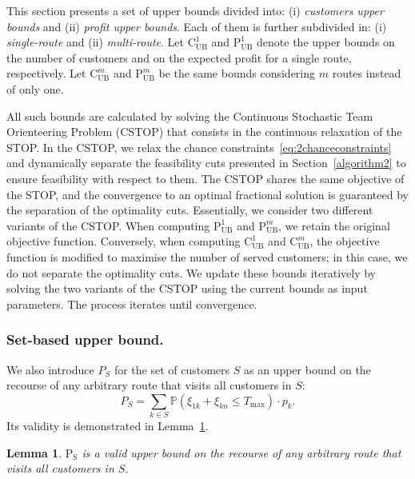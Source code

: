 \documentclass[11pt]{article}
\newtheorem{lemma}[theorem]{Lemma}
\theoremstyle{definition}
\begin{document}
This section presents a set of upper bounds divided into: (i) \emph{customers upper bounds} and (ii) \emph{profit upper bounds}. Each of them is further subdivided in: (i) \emph{single-route} and (ii) \emph{multi-route}. Let $\text{C}^1_{\text{UB}}$ and $\text{P}^1_{\text{UB}}$ denote the upper bounds on the number of customers and on the expected profit for a single route, respectively. Let $\text{C}^m_{\text{UB}}$ and $\text{P}^m_{\text{UB}}$ be the same bounds considering $m$ routes instead of only one.

All such bounds are calculated by solving the Continuous Stochastic Team Orienteering Problem (CSTOP) that consists in the continuous relaxation of the STOP. In the CSTOP, we relax the chance constraints~\eqref{eq:2chanceconstraints} and dynamically separate the feasibility cuts presented in Section~\ref{algorithm2} to ensure feasibility with respect to them. The CSTOP shares the same objective of the STOP, and the convergence to an optimal fractional solution is guaranteed by the separation of the optimality cuts.
%
%
Essentially, we consider two different variants of the CSTOP. When computing $\text{P}^1_{\text{UB}}$ and $\text{P}^m_{\text{UB}}$, we retain the original objective function. Conversely, when computing $\text{C}^1_{\text{UB}}$ and $\text{C}^m_{\text{UB}}$, the objective function is modified to maximise the number of served customers; in this case, we do not separate the optimality cuts. We update these bounds iteratively by solving the two variants of the CSTOP using the current bounds as input parameters. The process iterates until convergence.

\subsubsection{Set-based upper bound.}
\label{bounds:set-upper-bound}
We also introduce $P_S$ for the set of customers $S$ as an upper bound on the recourse of any arbitrary route that visits all customers in $S$:
%
\begin{equation}
\label{eq:set-ub}
P_S = \sum_{k \in S} \mathbb{P}(\xi_{1k} + \xi_{kn} \leq T_{\max}) \cdot p_k.
\end{equation}
%
Its validity is demonstrated in Lemma~\ref{lem:lemma7}.

\begin{lemma}
\label{lem:lemma7}
$\text{P}_{\text{S}}$ is a valid upper bound on the recourse of any arbitrary route that visits all customers in $S$.
\end{lemma}
\end{document}
